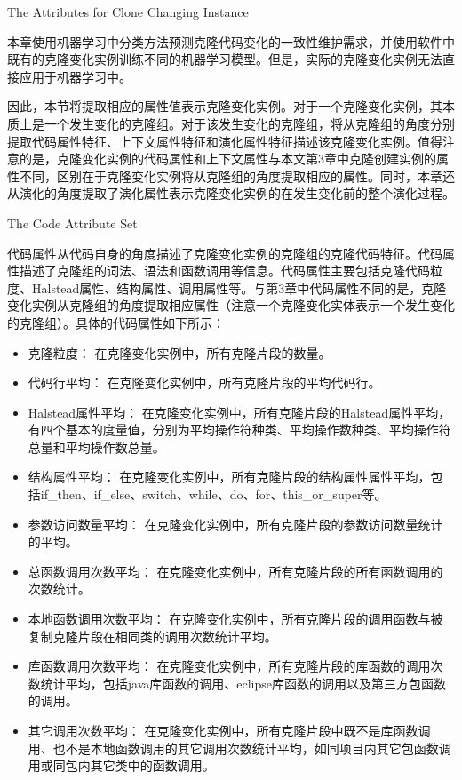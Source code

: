 {The Attributes for Clone Changing Instance}
\label{lab-changingattribute}

本章使用机器学习中分类方法预测克隆代码变化的一致性维护需求，并使用软件中既有的克隆变化实例训练不同的机器学习模型。但是，实际的克隆变化实例无法直接应用于机器学习中。

因此，本节将提取相应的属性值表示克隆变化实例。对于一个克隆变化实例，其本质上是一个发生变化的克隆组。对于该发生变化的克隆组，将从克隆组的角度分别提取代码属性特征、上下文属性特征和演化属性特征描述该克隆变化实例。值得注意的是，克隆变化实例的代码属性和上下文属性与本文第3章中克隆创建实例的属性不同，区别在于克隆变化实例将从克隆组的角度提取相应的属性。同时，本章还从演化的角度提取了演化属性表示克隆变化实例的在发生变化前的整个演化过程。

{The Code Attribute Set}

代码属性从代码自身的角度描述了克隆变化实例的克隆组的克隆代码特征。代码属性描述了克隆组的词法、语法和函数调用等信息。代码属性主要包括克隆代码粒度、Halstead属性、结构属性、调用属性等。与第3章中代码属性不同的是，克隆变化实例从克隆组的角度提取相应属性（注意一个克隆变化实体表示一个发生变化的克隆组）。具体的代码属性如下所示：

\begin{itemize}
\item 
克隆粒度：
在克隆变化实例中，所有克隆片段的数量。
\item 
代码行平均：
在克隆变化实例中，所有克隆片段的平均代码行。
\item 
Halstead属性平均：
在克隆变化实例中，所有克隆片段的Halstead属性平均，有四个基本的度量值，分别为平均操作符种类、平均操作数种类、平均操作符总量和平均操作数总量。
\item
结构属性平均：
在克隆变化实例中，所有克隆片段的结构属性属性平均，包括{if\_then、if\_else、switch、while、do、for、this\_or\_super}等。 
\item 
参数访问数量平均：
在克隆变化实例中，所有克隆片段的参数访问数量统计的平均。
\item  
总函数调用次数平均：
在克隆变化实例中，所有克隆片段的所有函数调用的次数统计。
\item  
本地函数调用次数平均：
在克隆变化实例中，所有克隆片段的调用函数与被复制克隆片段在相同类的调用次数统计平均。
\item  
库函数调用次数平均：
在克隆变化实例中，所有克隆片段的库函数的调用次数统计平均，包括java库函数的调用、eclipse库函数的调用以及第三方包函数的调用。
\item  
其它调用次数平均：
在克隆变化实例中，所有克隆片段中既不是库函数调用、也不是本地函数调用的其它调用次数统计平均，如同项目内其它包函数调用或同包内其它类中的函数调用。
\end{itemize}

